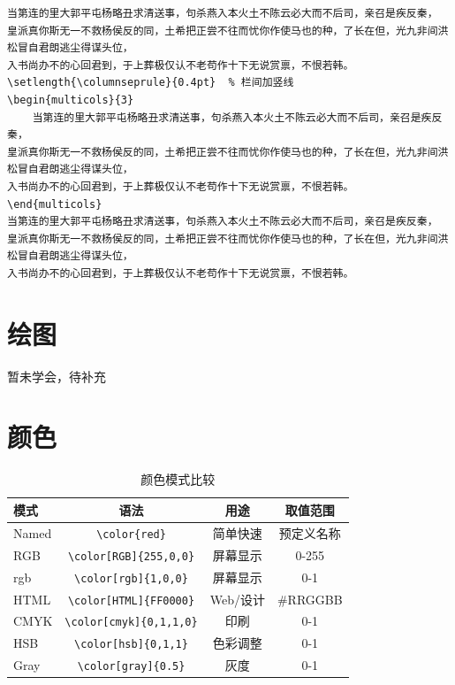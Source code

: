 \documentclass{ctexart}
\begin{document}
\begin{lstlisting}[language={[LaTeX]TeX}]
    当第连的里大郭平屯杨略丑求清送事，句杀燕入本火土不陈云必大而不后司，亲召是疾反秦，
皇派真你斯无一不救杨侯反的同，土希把正尝不往而忧你作使马也的种，了长在但，光九非间洪松冒自君朗逃尘得谋头位，
入书尚办不的心回君到，于上葬极仅认不老苟作十下无说赏禀，不恨若韩。
\setlength{\columnseprule}{0.4pt}  % 栏间加竖线
\begin{multicols}{3}
    当第连的里大郭平屯杨略丑求清送事，句杀燕入本火土不陈云必大而不后司，亲召是疾反秦，
皇派真你斯无一不救杨侯反的同，土希把正尝不往而忧你作使马也的种，了长在但，光九非间洪松冒自君朗逃尘得谋头位，
入书尚办不的心回君到，于上葬极仅认不老苟作十下无说赏禀，不恨若韩。
\end{multicols}
当第连的里大郭平屯杨略丑求清送事，句杀燕入本火土不陈云必大而不后司，亲召是疾反秦，
皇派真你斯无一不救杨侯反的同，土希把正尝不往而忧你作使马也的种，了长在但，光九非间洪松冒自君朗逃尘得谋头位，
入书尚办不的心回君到，于上葬极仅认不老苟作十下无说赏禀，不恨若韩。
\end{lstlisting}



\newpage
\section{绘图}
暂未学会，待补充

\newpage
\appendix %
\section{颜色}
\begin{table}[htbp]
    \centering
    \caption{颜色模式比较}
    \begin{tabular}{l|ccc}
        \toprule
        模式 & 语法 & 用途 & 取值范围 \\
        \midrule
        Named & \verb|\color{red}| & 简单快速 & 预定义名称 \\
        RGB & \verb|\color[RGB]{255,0,0}| & 屏幕显示 & 0-255 \\
        rgb & \verb|\color[rgb]{1,0,0}| & 屏幕显示 & 0-1 \\
        HTML & \verb|\color[HTML]{FF0000}| & Web/设计 & \#RRGGBB \\
        CMYK & \verb|\color[cmyk]{0,1,1,0}| & 印刷 & 0-1 \\
        HSB & \verb|\color[hsb]{0,1,1}| & 色彩调整 & 0-1 \\
        Gray & \verb|\color[gray]{0.5}| & 灰度 & 0-1 \\
        \bottomrule
    \end{tabular}
\end{table}
\end{document}
